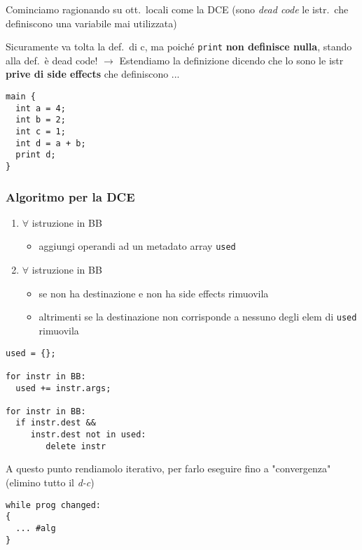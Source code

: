 Cominciamo ragionando su ott.~locali come la DCE (sono \textit{dead code} le istr.~che definiscono una variabile mai utilizzata)

\noindent\begin{minipage}[b]{.65\textwidth}
Sicuramente va tolta la def.~di c, ma poich\'e \lstinline|print| \textbf{non definisce nulla}, stando alla def.~\`e dead code! $\rightarrow$ Estendiamo la definizione dicendo che lo sono le istr \textbf{prive di side effects} che definiscono ... 
\end{minipage}\hfill
\begin{minipage}[c]{.3\textwidth}
\begin{lstlisting}
main {
  int a = 4;
  int b = 2;
  int c = 1;
  int d = a + b;
  print d;
}\end{lstlisting}
\end{minipage}

\subsubsection{Algoritmo per la DCE}

\begin{enumerate}
  \item $\forall$ istruzione in BB
    \begin{itemize}
      \item aggiungi operandi ad un metadato array \lstinline|used|
    \end{itemize}
  \item $\forall$ istruzione in BB
    \begin{itemize}
      \item se non ha destinazione e non ha side effects rimuovila
      \item altrimenti se la destinazione non corrisponde a nessuno degli elem di \lstinline|used| rimuovila
    \end{itemize} 
\end{enumerate}

\begin{lstlisting}
used = {};

for instr in BB:
  used += instr.args;

for instr in BB:
  if instr.dest &&
     instr.dest not in used:
        delete instr\end{lstlisting}

A questo punto rendiamolo iterativo, per farlo eseguire fino a "convergenza" (elimino tutto il \textit{d-c})
  
\begin{lstlisting}
while prog changed:
{
  ... #alg
}\end{lstlisting}

